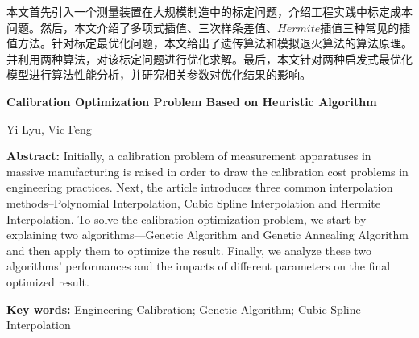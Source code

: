 \documentclass[10.5pt,twocolumn]{jbuaa}
\begin{document}
  \begin{@twocolumnfalse}
  \maketitle
\begin{CAbstractJBUAA}
本文首先引入一个测量装置在大规模制造中的标定问题，介绍工程实践中标定成本问题。然后，本文介绍了多项式插值、三次样条差值、$Hermite$插值三种常见的插值方法。针对标定最优化问题，本文给出了遗传算法和模拟退火算法的算法原理。并利用两种算法，对该标定问题进行优化求解。最后，本文针对两种启发式最优化模型进行算法性能分析，并研究相关参数对优化结果的影响。
\end{CAbstractJBUAA}
\begin{center}
\parbox{\textwidth}{
\setlength{\parindent}{1em}
{
\centering\sihao\textbf{Calibration Optimization Problem Based on Heuristic Algorithm}\\
} 
\vspace{-1.2mm}
\begin{center}
\wuhao Yi Lyu, Vic Feng\\[-0.1cm]
\end{center}

\wuhao
{
\textbf{Abstract:} 
Initially, a calibration problem of measurement apparatuses in massive manufacturing is raised in order to draw the calibration cost problems in engineering practices. Next, the article introduces three common interpolation methods--Polynomial Interpolation, Cubic Spline Interpolation and Hermite Interpolation. To solve the calibration optimization problem, we start by explaining two algorithms—Genetic Algorithm and Genetic Annealing Algorithm and then apply them to optimize the result. Finally, we analyze these two algorithms’ performances and the impacts of different parameters on the final optimized result.

\textbf{Key words:} Engineering Calibration; Genetic Algorithm; Cubic Spline Interpolation}
}
\end{center}


\end{@twocolumnfalse}
\end{document}
